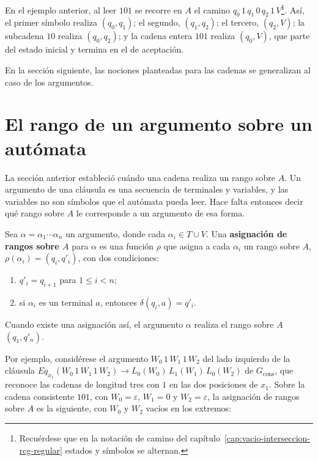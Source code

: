 En el ejemplo anterior, al leer $101$ se recorre en $A$ el camino
$q_0\,1\,q_1\,0\,q_2\,1\,V$\footnote{Recuérdese que en la notación de
camino del capítulo~\ref{cap:vacio-interseccion-rcg-regular} estados y
símbolos se alternan.}. Así, el primer símbolo realiza
$(q_0, q_1)$; el segundo, $(q_1, q_2)$; el tercero, $(q_2, V)$; la
subcadena $10$ realiza $(q_0, q_2)$; y la cadena entera $101$ realiza
$(q_0, V)$, que parte del estado inicial y termina en el de aceptación.

En la sección siguiente, las nociones planteadas para las cadenas se
generalizan al caso de los argumentos.

\section{El rango de un argumento sobre un autómata}\label{sec:rango-argumento}

La sección anterior estableció cuándo una cadena realiza un rango sobre
$A$. Un argumento de una cláusula es una secuencia de terminales y
variables, y las variables no son símbolos que el autómata pueda leer.
Hace falta entonces decir qué rango sobre $A$ le corresponde a un
argumento de esa forma.

\begin{definicion}
Sea $\alpha = \alpha_1 \cdots \alpha_n$ un argumento, donde cada
$\alpha_i \in T \cup V$. Una \textbf{asignación de rangos sobre $A$} para
$\alpha$ es una función $\rho$ que asigna a cada $\alpha_i$ un rango
sobre $A$, $\rho(\alpha_i) = (q_i, q'_i)$, con dos condiciones:
\begin{enumerate}
  \item $q'_i = q_{i+1}$ para $1 \le i < n$;
  \item si $\alpha_i$ es un terminal $a$, entonces $\delta(q_i, a) = q'_i$.
\end{enumerate}
Cuando existe una asignación así, el argumento $\alpha$ realiza
el rango sobre $A$ $(q_1, q'_n)$.
\end{definicion}

Por ejemplo, considérese el argumento $W_0\,1\,W_1\,1\,W_2$ del lado
izquierdo de la cláusula
$Eq_{x_1}(W_0\,1\,W_1\,1\,W_2) \to L_0(W_0)\,L_1(W_1)\,L_0(W_2)$ de
$G_{\mathrm{cons}}$, que reconoce las cadenas de longitud tres con $1$ en
las dos posiciones de $x_1$. Sobre la cadena consistente $101$, con
$W_0 = \varepsilon$, $W_1 = 0$ y $W_2 = \varepsilon$, la asignación de
rangos sobre $A$ es la siguiente, con $W_0$ y $W_2$ vacíos en los
extremos:

